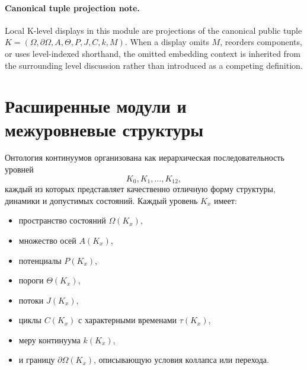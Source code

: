 


\paragraph{Canonical tuple projection note.}
Local K-level displays in this module are projections of the canonical public tuple \(K=(\Omega,\partial\Omega,A,\Theta,P,J,C,k,M)\). When a display omits \(M\), reorders components, or uses level-indexed shorthand, the omitted embedding context is inherited from the surrounding level discussion rather than introduced as a competing definition.

\section{Расширенные модули и межуровневые структуры}
\label{sec:klevels-master}

Онтология континуумов организована как иерархическая последовательность
уровней
\[
K_0, K_1, \dots, K_{12},
\]
каждый из которых представляет качественно отличную форму структуры,
динамики и допустимых состояний.
Каждый уровень $K_x$ имеет:
\begin{itemize}
    \item пространство состояний $\Omega(K_x)$,
    \item множество осей $A(K_x)$,
    \item потенциалы $P(K_x)$,
    \item пороги $\Theta(K_x)$,
    \item потоки $J(K_x)$,
    \item циклы $C(K_x)$ с характерными временами $\tau(K_x)$,
    \item меру континуума $k(K_x)$,
    \item и границу $\partial\Omega(K_x)$, описывающую условия
          коллапса или перехода.
\end{itemize}

